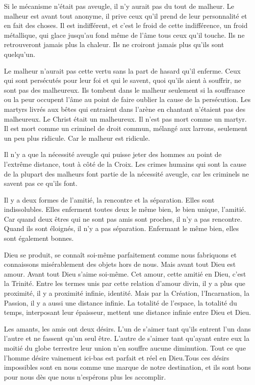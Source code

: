 \documentclass[french,twoside]{book} %
\begin{document}
Si le mécanisme n'était pas aveugle, il n'y aurait pas du tout de malheur. Le malheur est avant tout anonyme, il prive ceux qu'il prend de leur personnalité et en fait des choses. Il est indifférent, et c'est le froid de cette indifférence, un froid métallique, qui glace jusqu'au fond même de l'âme tous ceux qu'il touche. Ils ne retrouveront jamais plus la chaleur. Ils ne croiront jamais plus qu'ils sont quelqu'un.\par
Le malheur n'aurait pas cette vertu sans la part de hasard qu'il enferme. Ceux qui sont persécutés pour leur foi et qui le savent, quoi qu'ils aient à souffrir, ne sont pas des malheureux. Ils tombent dans le malheur seulement si la souffrance ou la peur occupent l'âme au point de faire oublier la cause de la persécution. Les martyrs livrés aux bêtes qui entraient dans l'arène en chantant n'étaient pas des malheureux. Le Christ était un malheureux. Il n'est pas mort comme un martyr. Il est mort comme un criminel de droit commun, mélangé aux larrons, seulement un peu plus ridicule. Car le malheur est ridicule.\par
Il n'y a que la nécessité aveugle qui puisse jeter des hommes au point de l'extrême distance, tout à côté de la Croix. Les crimes humains qui sont la cause de la plupart des malheurs font partie de la nécessité aveugle, car les criminels ne savent pas ce qu'ils font.\par
Il y a deux formes de l'amitié, la rencontre et la séparation. Elles sont indissolubles. Elles enferment toutes deux le même bien, le bien unique, l'amitié. Car quand deux êtres qui ne sont pas amis sont proches, il n'y a pas rencontre. Quand ils sont éloignés, il n'y a pas séparation. Enfermant le même bien, elles sont également bonnes.\par
Dieu se produit, se connaît soi-même parfaitement comme nous fabriquons et connaissons misérablement des objets hors de nous. Mais avant tout Dieu est amour. Avant tout Dieu s'aime soi-même. Cet amour, cette amitié en Dieu, c'est la Trinité. Entre les termes unis par cette relation d'amour divin, il y a plus que proximité, il y a proximité infinie, identité. Mais par la Création, l'Incarnation, la Passion, il y a aussi une distance infinie. La totalité de l'espace, la totalité du temps, interposant leur épaisseur, mettent une distance infinie entre Dieu et Dieu.\par
Les amants, les amis ont deux désirs. L'un de s'aimer tant qu'ils entrent l'un dans l'autre et ne fassent qu'un seul être. L'autre de s'aimer tant qu'ayant entre eux la moitié du globe terrestre leur union n'en souffre aucune diminution. Tout ce que l'homme désire vainement ici-bas est parfait et réel en Dieu.Tous ces désirs impossibles sont en nous comme une marque de notre destination, et ils sont bons pour nous dès que nous n'espérons plus les accomplir.\par
\end{document}
